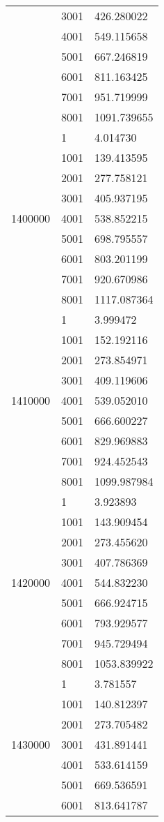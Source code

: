 \begin{table}[htb!]
\begin{tabular}{lll}
 & 3001 & 426.280022 \\
 & 4001 & 549.115658 \\
 & 5001 & 667.246819 \\
 & 6001 & 811.163425 \\
 & 7001 & 951.719999 \\
 & 8001 & 1091.739655 \\
\multirow[c]{9}{*}{1400000} & 1 & 4.014730 \\
 & 1001 & 139.413595 \\
 & 2001 & 277.758121 \\
 & 3001 & 405.937195 \\
 & 4001 & 538.852215 \\
 & 5001 & 698.795557 \\
 & 6001 & 803.201199 \\
 & 7001 & 920.670986 \\
 & 8001 & 1117.087364 \\
\multirow[c]{9}{*}{1410000} & 1 & 3.999472 \\
 & 1001 & 152.192116 \\
 & 2001 & 273.854971 \\
 & 3001 & 409.119606 \\
 & 4001 & 539.052010 \\
 & 5001 & 666.600227 \\
 & 6001 & 829.969883 \\
 & 7001 & 924.452543 \\
 & 8001 & 1099.987984 \\
\multirow[c]{9}{*}{1420000} & 1 & 3.923893 \\
 & 1001 & 143.909454 \\
 & 2001 & 273.455620 \\
 & 3001 & 407.786369 \\
 & 4001 & 544.832230 \\
 & 5001 & 666.924715 \\
 & 6001 & 793.929577 \\
 & 7001 & 945.729494 \\
 & 8001 & 1053.839922 \\
\multirow[c]{9}{*}{1430000} & 1 & 3.781557 \\
 & 1001 & 140.812397 \\
 & 2001 & 273.705482 \\
 & 3001 & 431.891441 \\
 & 4001 & 533.614159 \\
 & 5001 & 669.536591 \\
 & 6001 & 813.641787 \\

\end{tabular}
\end{table}
